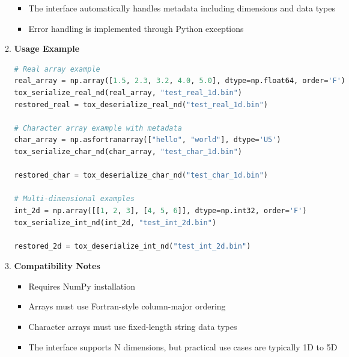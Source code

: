 \begin{enumerate}
\begin{enumerate}
\begin{itemize}
                    \item The interface automatically handles metadata including dimensions
                          and data types
                          
                    \item Error handling is implemented through Python exceptions
                  \end{itemize}
                  
            \item \textbf{Usage Example}
                  
                  \begin{lstlisting}[language=Python, caption={Full example of serialization and deserialization}]
# Real array example
real_array = np.array([1.5, 2.3, 3.2, 4.0, 5.0], dtype=np.float64, order='F')
tox_serialize_real_nd(real_array, "test_real_1d.bin")
restored_real = tox_deserialize_real_nd("test_real_1d.bin")

# Character array example with metadata
char_array = np.asfortranarray(["hello", "world"], dtype='U5')
tox_serialize_char_nd(char_array, "test_char_1d.bin")

restored_char = tox_deserialize_char_nd("test_char_1d.bin")

# Multi-dimensional examples
int_2d = np.array([[1, 2, 3], [4, 5, 6]], dtype=np.int32, order='F')
tox_serialize_int_nd(int_2d, "test_int_2d.bin")

restored_2d = tox_deserialize_int_nd("test_int_2d.bin")
                  \end{lstlisting}
                  
            \item \textbf{Compatibility Notes}
                  
                  \begin{itemize}
                    \item Requires NumPy installation
                          
                    \item Arrays must use Fortran-style column-major ordering
                          
                    \item Character arrays must use fixed-length string data types
                          
                    \item The interface supports N dimensions, but practical use cases
                          are typically 1D to 5D
                          

\end{itemize}
\end{enumerate}
\end{enumerate}

